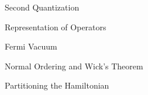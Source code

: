 \documentclass[twoside,english]{uiofysmaster}
\begin{document}
\begin{chapter}{Second Quantization}
\begin{section}{Representation of Operators}
 \end{section}

 \begin{section}{Fermi Vacuum}
 	
 \end{section}

 \begin{section}{Normal Ordering and Wick's Theorem}
 	
 \end{section}

 \begin{section}{Partitioning the Hamiltonian}
 	
 \end{section}
 
\end{chapter}
\end{document}
